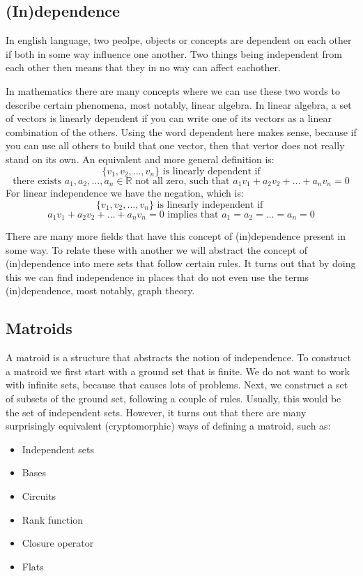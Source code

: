 \subsection{(In)dependence}

In english language, two peolpe, objects or concepts are dependent on each other if both in some way influence one another. Two things being independent from each other then means that they in no way can affect eachother. 

In mathematics there are many concepts where we can use these two words to describe certain phenomena, most notably, linear algebra. In linear algebra, a set of vectors is linearly dependent if you can write one of its vectors as a linear combination of the others. Using the word dependent here makes sense, because if you can use all others to build that one vector, then that vertor does not really stand on its own. An equivalent and more general definition is:
$$ \{v_1,v_2,\dots,v_n\} \text{ is linearly dependent if} $$ $$ \text{there exists } a_1,a_2,\dots,a_n \in \mathbb{R} \text{ not all zero, such that } a_1v_1+a_2v_2+\dots +a_nv_n = 0$$
For linear independence we have the negation, which is:
$$ \{v_1,v_2,\dots,v_n\} \text{ is linearly independent if } $$ $$ a_1v_1+a_2v_2+\dots+a_nv_n=0 \text{ implies that } a_1=a_2=\dots=a_n=0 $$

There are many more fields that have this concept of (in)dependence present in some way. To relate these with another we will abstract the concept of (in)dependence into mere sets that follow certain rules. It turns out that by doing this we can find independence in places that do not even use the terms (in)dependence, most notably, graph theory.







\subsection{Matroids}

A matroid is a structure that abstracts the notion of independence. To construct a matroid we first start with a ground set that is finite. We do not want to work with infinite sets, because that causes lots of problems. Next, we construct a set of subsets of the ground set, following a couple of rules. Usually, this would be the set of independent sets. However, it turns out that there are many surprisingly equivalent (cryptomorphic) ways of defining a matroid, such as:
\begin{itemize}
    \item Independent sets
    \item Bases
    \item Circuits
    \item Rank function
    \item Closure operator
    \item Flats
\end{itemize}

